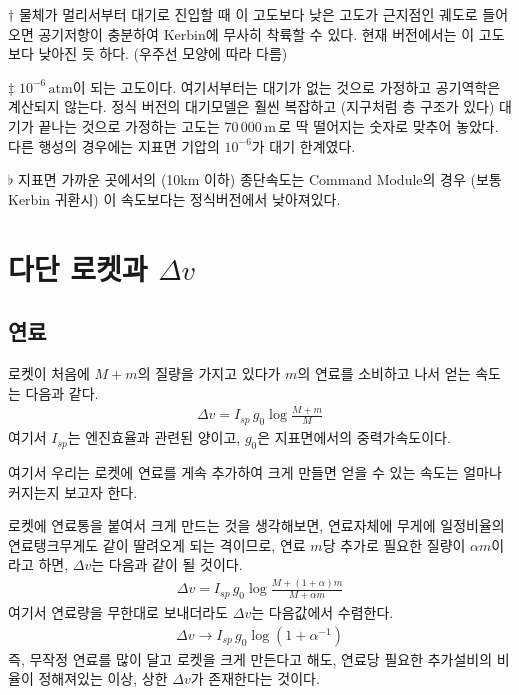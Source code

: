 \documentclass[9pt,twoside,openany]{amsbook}
\begin{document}
\begin{table}
\begin{center}
\begin{threeparttable}
\begin{tabular}{|r|r|r|r|r|}
			\\\cline{4-5}
		\end{tabular}
	\begin{tablenotes}
		\item [$\dagger$] \small 물체가 멀리서부터 대기로 진입할 때 이 고도보다 낮은 고도가 근지점인 궤도로 들어오면
						 공기저항이 충분하여 Kerbin에 무사히 착륙할 수 있다.
						 현재 버전에서는 이 고도보다 낮아진 듯 하다. (우주선 모양에 따라 다름)
		\item[$\ddagger$] $10^{-6}\,\mathrm{atm}$이 되는 고도이다. 여기서부터는 대기가 없는 것으로 가정하고 공기역학은 계산되지 않는다. 정식 버전의 대기모델은 훨씬 복잡하고 (지구처럼 층 구조가 있다) 대기가 끝나는 것으로 가정하는 고도는 70\,000\,m\,로 딱 떨어지는 숫자로 맞추어 놓았다. 다른 행성의 경우에는 지표면 기압의 $10^{-6}$가 대기 한계였다. 
		\item[$\flat$] 지표면 가까운 곳에서의 (10km 이하) 종단속도는 Command Module의 경우 (보통 Kerbin 귀환시) 이 속도보다는 정식버전에서 낮아져있다.
	\end{tablenotes}
\end{threeparttable}
\end{center}
\end{table}

\chapter{다단 로켓과 $\Delta v$}
\section{연료}
로켓이 처음에 $M+m$의 질량을 가지고 있다가 $m$의 연료를 소비하고 나서 얻는 속도는 다음과 같다.
\begin{align}
    \Delta v =I_{sp}\, g_0\log\frac{M+m}{M}
\end{align}
여기서 $I_{sp}$는 엔진효율과 관련된 양이고, $g_0$은 지표면에서의 중력가속도이다.

여기서 우리는 로켓에 연료를 게속 추가하여 크게 만들면 얻을 수 있는 속도는 얼마나 커지는지 보고자 한다.

로켓에 연료통을 붙여서 크게 만드는 것을 생각해보면, 연료자체에 무게에 일정비율의 연료탱크무게도 같이 딸려오게 되는 격이므로, 연료 $m$당 추가로 필요한 질량이 $\alpha m$이라고 하면,
$\Delta v$는 다음과 같이 될 것이다.
\begin{align}
    \Delta v = I_{sp}\, g_0\log\frac{M+(1+\alpha) m}{M+\alpha m}
\end{align}
여기서 연료량을 무한대로 보내더라도 $\Delta v$는 다음값에서 수렴한다.
\begin{align}
    \Delta v \rightarrow I_{sp}\, g_0\log(1+\alpha^{-1})
\end{align}
즉, 무작정 연료를 많이 달고 로켓을 크게 만든다고 해도, 연료당 필요한 추가설비의 비율이 정해져있는 이상, 상한 $\Delta v$가 존재한다는 것이다.
\end{document}
